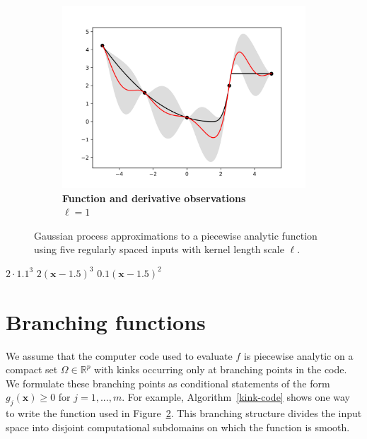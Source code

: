 \documentclass{article}
\renewcommand{\vec}[1]{\mathbf{#1}}
\newcommand{\R}{\mathbb{R}}
\numberwithin{equation}{section}
\begin{document}
\begin{figure}[H]
    \begin{subfigure}[t]{.33\textwidth}
      \centering
      \includegraphics[scale=0.35]{figures/kink-shortder.png}
      \caption{\textbf{Function and derivative observations} \\ $\ell = 1$}
      \label{kink:short}
    \end{subfigure}
		\caption{Gaussian process approximations to a piecewise analytic function using five regularly spaced inputs with kernel length scale $\ell$.}
		\label{kink}
\end{figure}
\begin{algorithm}[H]
    \captionsetup{justification=centering}
    \begin{algorithmic}
    \IF{$g_1(\vec{x}) \geq 0$}
        \RETURN $2\cdot1.1^3$
    \ELSIF{$g_2(\vec{x}) \geq 0$}
        \RETURN $2(\vec{x}-1.5)^3$
    \ELSE
        \RETURN $0.1(\vec{x}-1.5)^2$
    \ENDIF
    \end{algorithmic}
    \caption{: $g_1(\vec{x}) = \vec{x}-2.6$, $g_2(\vec{x}) = \vec{x}-1.5$}
	\label{kink-code}
\end{algorithm}

\section{Branching functions}
We assume that the computer code used to evaluate $f$ is piecewise analytic on a compact set $\Omega \in \R^p$ with kinks occurring only at branching points in the code. We formulate these branching points as conditional statements of the form $g_j(\vec{x}) \geq 0$ for $j=1,...,m$. For example, Algorithm~\ref{kink-code} shows one way to write the function used in Figure~\ref{kink}. This branching structure divides the input space into disjoint computational subdomains on which the function is smooth.
\end{document}
